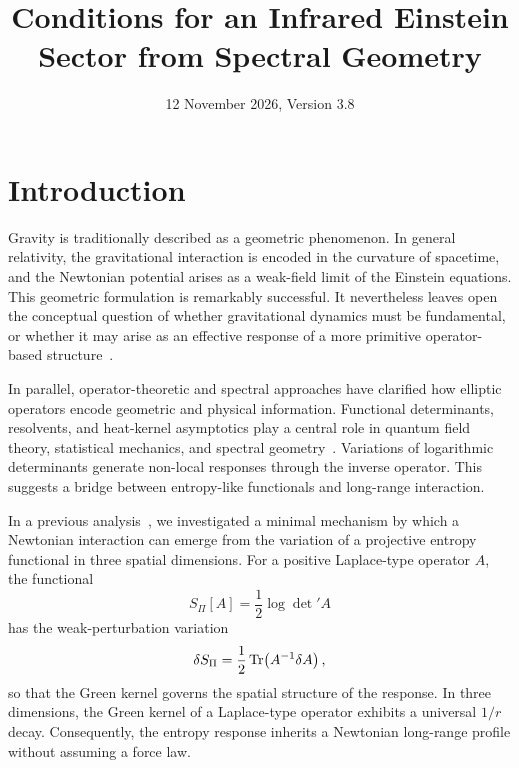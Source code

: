\documentclass[pdflatex,sn-mathphys-num]{sn-jnl} %
\title{Conditions for an Infrared Einstein Sector from Spectral Geometry}
\author*[1]{\fnm{Jérôme} \sur{Beau}}\email{jerome.beau@cosmochrony.org}
\affil*[1]{\orgname{Independent Researcher}, \country{France}}
\date{12 November 2026, Version 3.8}
\theoremstyle{remark}
\theoremstyle{plain}
\begin{document}
  \maketitle

  \tableofcontents

  \clearpage

  \section{Introduction}
    \label{sec:introduction}

    Gravity is traditionally described as a geometric phenomenon.
    In general relativity, the gravitational interaction is encoded in the curvature of spacetime, and the Newtonian
    potential arises as a weak-field limit of the Einstein equations.
    This geometric formulation is remarkably successful.
    It nevertheless leaves open the conceptual question of whether gravitational dynamics must be fundamental, or
    whether it may arise as an effective response of a more primitive operator-based structure~\cite{Cosmochrony}.

    In parallel, operator-theoretic and spectral approaches have clarified how elliptic operators encode geometric and
    physical information.
    Functional determinants, resolvents, and heat-kernel asymptotics play a central role in quantum field theory,
    statistical mechanics, and spectral geometry~\cite{Vassilevich2003,ParkerToms2009}.
    Variations of logarithmic determinants generate non-local responses through the inverse operator.
    This suggests a bridge between entropy-like functionals and long-range interaction.

    In a previous analysis~\cite{Beau2026a}, we investigated a minimal mechanism by which a Newtonian interaction
    can emerge from the
    variation of a projective entropy functional in three spatial dimensions.
    For a positive Laplace-type operator \(A\), the functional
    \begin{equation}
      S_\Pi[A] = \frac12 \log \det\nolimits' A
    \end{equation}
    has the weak-perturbation variation
    \begin{equation}
      \delta S_\Pi = \frac12 \Tr\!\left(A^{-1}\delta A\right),
    \end{equation}
    so that the Green kernel governs the spatial structure of the response.
    In three dimensions, the Green kernel of a Laplace-type operator exhibits a universal \(1/r\) decay.
    Consequently, the entropy response inherits a Newtonian long-range profile without assuming a force law.
\end{document}
